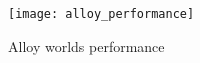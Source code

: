 \begin{figure}[H]
    \centering
    \texttt{[image: alloy\_performance]}
    \caption{Alloy worlds performance}
    \label{fig:alloy_Performance}
\end{figure}